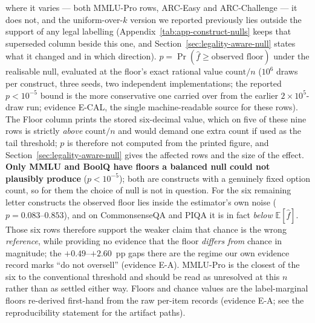 \begin{table}[t]
{where it varies --- both MMLU-Pro rows, ARC-Easy and ARC-Challenge --- it does not, and the
uniform-over-$k$ version we reported previously lies outside the support of any legal labelling
(Appendix~\ref{tab:app-construct-nulls} keeps that superseded column beside this one, and
Section~\ref{sec:legality-aware-null} states what it changed and in which direction).
$p=\Pr(\hat f\ge\text{observed floor})$ under the realisable null, evaluated at the floor's exact
rational value $\text{count}/n$ ($10^{6}$ draws per construct, three seeds, two independent
implementations; the reported $p<10^{-5}$ bound is the more conservative one carried over from the
earlier $2\times10^{5}$-draw run; evidence \textsf{E-CAL}, the single machine-readable source for
these rows). The Floor column prints the stored six-decimal value, which on five of these nine
rows is strictly \emph{above} $\text{count}/n$ and would demand one extra count if used as the
tail threshold; $p$ is therefore not computed from the printed figure, and
Section~\ref{sec:legality-aware-null} gives the affected rows and the size of the effect.
\textbf{Only MMLU and BoolQ have floors a balanced null could not plausibly produce}
($p<10^{-5}$); both are constructs with a genuinely fixed option count, so for them the choice of
null is not in question. For the six remaining letter constructs the observed floor lies inside the
estimator's own noise ($p=0.083$--$0.853$), and on CommonsenseQA and PIQA it is in fact
\emph{below} $\mathbb{E}[\hat f]$. Those six rows therefore support the weaker claim that chance is
the wrong \emph{reference}, while providing no evidence that the floor \emph{differs from} chance in
magnitude; the $+0.49$--$+2.60$~pp gaps there are the regime our own evidence record marks ``do not
oversell'' (evidence \textsf{E-A}). MMLU-Pro is the closest of the six to the conventional
threshold and should be read as unresolved at this $n$ rather than as settled either way. Floors and
chance values are the label-marginal floors re-derived first-hand from the raw per-item records
(evidence \textsf{E-A}; see the reproducibility statement for the artifact paths).}
\label{tab:nulls}
\end{table}
